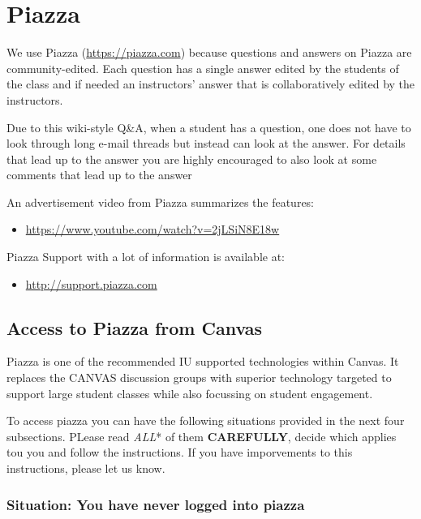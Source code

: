 \FILENAME

\section{Piazza}\label{piazza}

We use Piazza (\url{https://piazza.com}) because questions and answers
on Piazza are community-edited. Each question has a single answer edited
by the students of the class and if needed an instructors' answer that
is collaboratively edited by the instructors.

Due to this wiki-style Q\&A, when a student has a question, one does not
have to look through long e-mail threads but instead can look at the
answer. For details that lead up to the answer you are highly encouraged
to also look at some comments that lead up to the answer

An advertisement video from Piazza summarizes the features:

\begin{itemize}
\tightlist
\item
  \url{https://www.youtube.com/watch?v=2jLSiN8E18w}
\end{itemize}

Piazza Support with a lot of information is available at:

\begin{itemize}
\tightlist
\item
  \url{http://support.piazza.com}
\end{itemize}

\subsection{Access to Piazza from
Canvas}\label{access-to-piazza-from-canvas}

Piazza is one of the recommended IU supported technologies within
Canvas. It replaces the CANVAS discussion groups with superior
technology targeted to support large student classes while also
focussing on student engagement.

To access piazza you can have the following situations provided in the
next four subsections. PLease read \emph{ALL}* of them
\textbf{CAREFULLY}, decide which applies tou you and follow the
instructions. If you have imporvements to this instructions, please let
us know.

\subsubsection{Situation: You have never logged into
piazza}\label{situation-you-have-never-logged-into-piazza}


